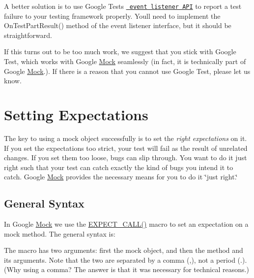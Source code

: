 A better solution is to use Google Test\textquotesingle{}s \href{../../googletest/docs/advanced.md\#extending-google-test-by-handling-test-events}{\texttt{ event listener A\+PI}} to report a test failure to your testing framework properly. You\textquotesingle{}ll need to implement the {\ttfamily On\+Test\+Part\+Result()} method of the event listener interface, but it should be straightforward.

If this turns out to be too much work, we suggest that you stick with Google Test, which works with Google \mbox{\hyperlink{class_mock}{Mock}} seamlessly (in fact, it is technically part of Google \mbox{\hyperlink{class_mock}{Mock}}.). If there is a reason that you cannot use Google Test, please let us know.

\section*{Setting Expectations}

The key to using a mock object successfully is to set the {\itshape right expectations} on it. If you set the expectations too strict, your test will fail as the result of unrelated changes. If you set them too loose, bugs can slip through. You want to do it just right such that your test can catch exactly the kind of bugs you intend it to catch. Google \mbox{\hyperlink{class_mock}{Mock}} provides the necessary means for you to do it \char`\"{}just right.\char`\"{}

\subsection*{General Syntax}

In Google \mbox{\hyperlink{class_mock}{Mock}} we use the {\ttfamily \mbox{\hyperlink{googletest-master_2googlemock_2include_2gmock_2gmock-spec-builders_8h_a535a6156de72c1a2e25a127e38ee5232}{E\+X\+P\+E\+C\+T\+\_\+\+C\+A\+L\+L()}}} macro to set an expectation on a mock method. The general syntax is\+:


\begin{DoxyCode}{0}
\end{DoxyCode}


The macro has two arguments\+: first the mock object, and then the method and its arguments. Note that the two are separated by a comma ({\ttfamily ,}), not a period ({\ttfamily .}). (Why using a comma? The answer is that it was necessary for technical reasons.)

